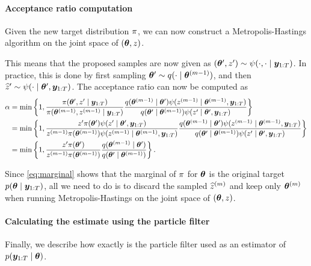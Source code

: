 \paragraph{Acceptance ratio computation}
Given the new target distribution $\pi$, we can now construct a Metropolis-Hastings algorithm on the joint space of $(\bm{\theta}, z)$.

This means that the proposed samples are now given as $(\bm{\theta}^\prime, z^\prime) \sim \psi(\cdot, \cdot \mid \bm{y}_{1:T})$. In practice, this is done by first sampling $\bm{\theta}^\prime \sim q(\cdot \mid \bm{\theta}^{(m-1)})$, and then $\widehat{z}^\prime \sim \psi(\cdot \mid \bm{\theta}^\prime, \bm{y}_{1:T})$. The acceptance ratio can now be computed as
\begin{equation*}
\begin{split}
\alpha & = \min \left\{1, \frac{\pi(\bm{\theta}^\prime, z^\prime \mid \bm{y}_{1:T})}{\pi(\bm{\theta}^{(m-1)}, z^{(m-1)} \mid \bm{y}_{1:T})} \frac{q(\bm{\theta}^{(m-1)} \mid \bm{\theta}^\prime) \psi(z^{(m-1)} \mid \bm{\theta}^{(m-1)}, \bm{y}_{1:T})}{q(\bm{\theta}^\prime \mid \bm{\theta}^{(m-1)}) \psi(z^\prime \mid \bm{\theta}^\prime, \bm{y}_{1:T})} \right\} \\
& = \min \left\{1, \frac{z^\prime \pi(\bm{\theta}^\prime) \psi(z^\prime \mid \bm{\theta}^\prime, \bm{y}_{1:T})}{z^{(m-1)} \pi(\bm{\theta}^{(m-1)}) \psi(z^{(m-1)} \mid \bm{\theta}^{(m-1)}, \bm{y}_{1:T})} \frac{q(\bm{\theta}^{(m-1)} \mid \bm{\theta}^\prime) \psi(z^{(m-1)} \mid \bm{\theta}^{(m-1)}, \bm{y}_{1:T})}{q(\bm{\theta}^\prime \mid \bm{\theta}^{(m-1)}) \psi(z^\prime \mid \bm{\theta}^\prime, \bm{y}_{1:T})} \right\} \\
& = \min \left\{1, \frac{z^\prime \pi(\bm{\theta}^\prime)}{z^{(m-1)} \pi(\bm{\theta}^{(m-1)})} \frac{q(\bm{\theta}^{(m-1)} \mid \bm{\theta}^\prime)}{q(\bm{\theta}^\prime \mid \bm{\theta}^{(m-1)})} \right\}.
\end{split}
\end{equation*}

Since \eqref{eq:marginal} shows that the marginal of $\pi$ for $\bm{\theta}$ is the original target $p(\bm{\theta} \mid \bm{y}_{1:T})$, all we need to do is to discard the sampled $\widehat{z}^{(m)}$ and keep only $\bm{\theta}^{(m)}$ when running Metropolis-Hastings on the joint space of $(\bm{\theta}, z)$.

\paragraph{Calculating the estimate using the particle filter}
Finally, we describe how exactly is the particle filter used as an estimator of $p(\bm{y}_{1:T} \mid \bm{\theta})$.

